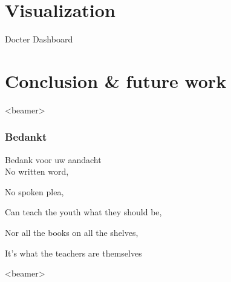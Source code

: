 \documentclass[english]{beamer}
\begin{document}
\section{Visualization}
\begin{frame}{Docter Dashboard}
	
\end{frame}
\section{Conclusion \& future work}






\begin{frame}<beamer> 
  \frametitle{Bedankt}
	  {\huge \color{ugentyellow} Bedank voor uw aandacht}\\
	  No written word,
	  
	  No spoken plea,
	  
	  Can teach the youth what they should be,
	  
	  Nor all the books on all the shelves,
	  
	  It's what the teachers are themselves 
\end{frame}

\begin{frame}<beamer> 
	\footnotesize{\tableofcontents[hidesubsections]}
\end{frame}
\end{document}
